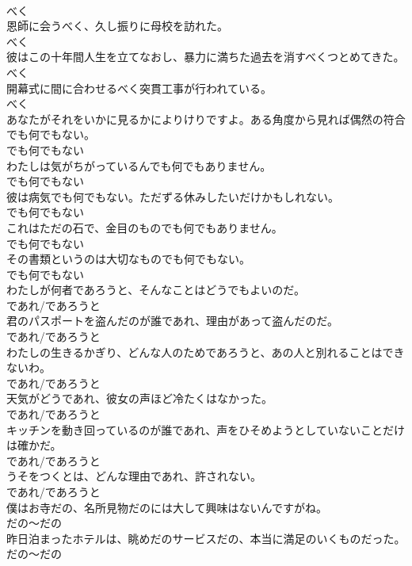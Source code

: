 \documentclass[8pt]{extreport}
\begin{document}
\begin{CJK}{UTF8}{min}
\\	べく
\\	恩師に会うべく、久し振りに母校を訪れた。	
\\	べく
\\	彼はこの十年間人生を立てなおし、暴力に満ちた過去を消すべくつとめてきた。	
\\	べく
\\	開幕式に間に合わせるべく突貫工事が行われている。	
\\	べく
\\	あなたがそれをいかに見るかによりけりですよ。ある角度から見れば偶然の符合でも何でもない。	
\\	でも何でもない
\\	わたしは気がちがっているんでも何でもありません。	
\\	でも何でもない
\\	彼は病気でも何でもない。ただずる休みしたいだけかもしれない。	
\\	でも何でもない
\\	これはただの石で、金目のものでも何でもありません。	
\\	でも何でもない
\\	その書類というのは大切なものでも何でもない。	
\\	でも何でもない
\\	わたしが何者であろうと、そんなことはどうでもよいのだ。	
\\	であれ/であろうと
\\	君のパスポートを盗んだのが誰であれ、理由があって盗んだのだ。	
\\	であれ/であろうと
\\	わたしの生きるかぎり、どんな人のためであろうと、あの人と別れることはできないわ。	
\\	であれ/であろうと
\\	天気がどうであれ、彼女の声ほど冷たくはなかった。	
\\	であれ/であろうと
\\	キッチンを動き回っているのが誰であれ、声をひそめようとしていないことだけは確かだ。	
\\	であれ/であろうと
\\	うそをつくとは、どんな理由であれ、許されない。	
\\	であれ/であろうと
\\	僕はお寺だの、名所見物だのには大して興味はないんですがね。	
\\	だの～だの
\\	昨日泊まったホテルは、眺めだのサービスだの、本当に満足のいくものだった。	
\\	だの～だの

\end{CJK}
\end{document}
